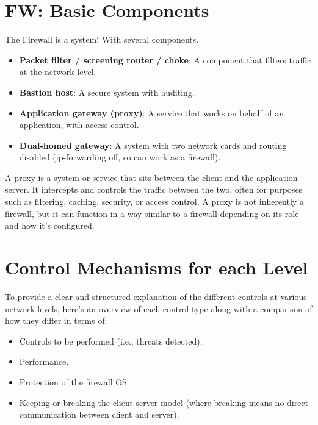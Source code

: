 \section*{FW: Basic Components}
\begin{tcolorbox}[colback=red!10!white, colframe=red!70!black, coltitle=white, title=Beware]
The Firewall is a system! With several components.
\end{tcolorbox}

\begin{itemize}
    \item \textbf{Packet filter / screening router / choke}: A component that filters traffic at the network level.
    \item \textbf{Bastion host}: A secure system with auditing.
    \item \textbf{Application gateway (proxy)}: A service that works on behalf of an application, with access control.
    \item \textbf{Dual-homed gateway}: A system with two network cards and routing disabled (ip-forwarding off, so can work as a firewall).
\end{itemize}

\begin{tcolorbox}[colback=blue!10!white, colframe=blue!50!white, title=What is a Proxy]
    A proxy is a system or service that sits between the client and the application server. It intercepts and controls the traffic between the two, often for purposes such as filtering, caching, security, or access control. A proxy is not inherently a firewall, but it can function in a way similar to a firewall depending on its role and how it's configured.
\end{tcolorbox}

\section{Control Mechanisms for each Level}
To provide a clear and structured explanation of the different controls at various network levels, here's an overview of each control type along with a comparison of how they differ in terms of:
\begin{itemize}
    \item Controls to be performed (i.e., threats detected).
    \item Performance.
    \item Protection of the firewall OS.
    \item Keeping or breaking the client-server model (where breaking means no direct communication between client and server).
\end{itemize}

